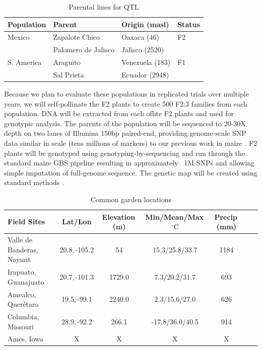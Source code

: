 \begin{table}
\begin{center}
\caption{Parental lines for QTL} \label{tab:qtlpops}
\begin{tabular}{llll}\\\toprule  
{\bf Population}	& {\bf Parent } &	{\bf Origin (masl)} & {\bf Status }\\ \midrule
 \rowcolor{gray!25}
Mexico	& Zapalote Chico		& Oaxaca	 (46)		&  F2 \\ 
 \rowcolor{gray!25}
	& 	Palomero de Jalisco	& 	Jalisco (2520)		& \\
S. America	& Araguito	& Venezuela (183)	&  F1 \\ 
	& Sal Prieta	 & Ecuador (2948) & \\ \bottomrule
\end{tabular}
\end{center}
\end{table} 

Because we plan to evaluate these populations in replicated trials over multiple years, we will self-pollinate the F2 plants to create 500 F2:3 families from each population.  DNA will be extracted from each ofhte F2 plants and used for genotypic analysis.   The parents of the population will be sequenced to 20-30X depth on two lanes of Illumina 150bp paired-end, providing genome-scale SNP data similar in scale (tens millions of markers) to our previous work in maize  \citep[HapMap.v2;][]{Chia2012a}.  F2 plants will be genotyped using genotyping-by-sequencing \citep[GBS;][]{Elshire2011} and run through the standard maize GBS pipeline \citep{Glaubitz2014} resulting in approximately ~1M SNPs and allowing simple imputation of full-genome sequence.  The genetic map will be created using standard methods \citep[e.g.][]{Broman2003a}. 

\begin{table}
\begin{center}
\caption{Common garden locations} \label{tab:locales}
\begin{tabular}{p{2cm}cccccc}\\\toprule  
{\bf Field Sites} & {\bf Lat/Lon } & {\bf Elevation\,(m) } &	{\bf Min/Mean/Max\,$^{\circ}\mathrm{C}$  } & {\bf Precip\,(mm) } \\ \toprule
Valle de Banderas, Nayarit	& 20.8,\,-105.2&	54		&	15.3/25.8/33.7	&	1184 \\
Irapuato, Guanajuato 	&	20.7,\,-101.3	&	1729.0	&	7.3/20.2/31.7	&	693 \\
Amealco, Quer\'etaro 	&	19.5,\,-99.1	&	2240.0 	&	2.3/15.6/27.0	&	626\\
Columbia, Missouri		& 	28.9,\,-92.2	&	266.1 	&	-17.8/36.0/40.5&	914\\
Ames, Iowa	& 	X	&	X 	&	X		&	X	 \\ \bottomrule
\end{tabular}
\end{center}
\end{table} 

